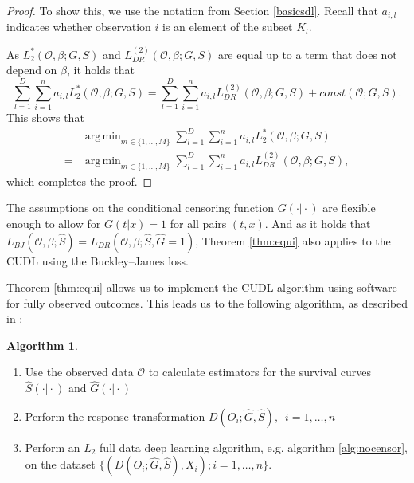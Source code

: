 \documentclass[12pt, a4paper]{scrartcl}
\theoremstyle{definition}
\newtheorem{Algorithm}{Algorithm}[section]
\theoremstyle{plain}
\numberwithin{equation}{section}
\numberwithin{figure}{section}
\numberwithin{table}{section}
\DeclareMathOperator*{\argmin}{arg\,min}
\begin{document}
\begin{proof}
		To show this, we use the notation from Section \ref{basicsdl}.
		Recall that $a_{i,l}$ indicates whether observation $i$ is an element of the subset $K_l$.
		
		As $L_2^*(\mathcal{O}, \beta; G,S)$ and $L_{DR}^{(2)}(\mathcal{O}, \beta; G,S)$ are equal up to a term that does not depend on $\beta$, it holds that
		\begin{equation*}
		\sum_{l=1}^{D} \sum_{i=1}^{n} a_{i,l} L_2^*(\mathcal{O}, \beta; G,S) = \sum_{l=1}^{D} \sum_{i=1}^{n} a_{i,l} L_{DR}^{(2)}(\mathcal{O}, \beta; G,S) + const(\mathcal{O}; G,S).
		\end{equation*}
		This shows that
		\begin{equation*}
		\begin{split}
		 &\argmin_{m \in \{1,\dots, M\}}\sum_{l=1}^{D} \sum_{i=1}^{n} a_{i,l} L_2^*(\mathcal{O}, \beta; G,S)\\
		  = &\argmin_{m \in \{1,\dots, M\}}\sum_{l=1}^{D} \sum_{i=1}^{n} a_{i,l} L_{DR}^{(2)}(\mathcal{O}, \beta; G,S),
		 \end{split}
		\end{equation*}
		which completes the proof.
	\end{proof}

	The assumptions on the conditional censoring function $G(\cdot\vert\cdot)$ are flexible enough to allow for $G(t\vert x)=1$ for all pairs $(t,x)$.
	And as it holds that $L_{BJ}(\mathcal{O}, \beta; \hat{S})=L_{DR}(\mathcal{O}, \beta; \hat{S}, \hat{G} = 1)$, Theorem \ref{thm:equi} also applies to the CUDL using the Buckley--James loss.
	
	Theorem \ref{thm:equi} allows us to implement the CUDL algorithm using software for fully observed outcomes.
	This leads us to the following algorithm, as described in \citet*{basearticle}:
	\begin{Algorithm}\label{alg:censor}~
		\begin{enumerate}
			\item Use the observed data $\mathcal{O}$ to calculate estimators for the survival curves $\hat{S}(\cdot\vert\cdot)$ and $\hat{G}(\cdot\vert\cdot)$
			\item Perform the response transformation $D(O_i; \hat{G},\hat{S}),$~$ i = 1,\dots,n$
			\item Perform an $L_2$ full data deep learning algorithm, e.g. algorithm \ref{alg:nocensor}, on the dataset $\{(D(O_i; \hat{G},\hat{S}), X_i); i = 1,\dots,n\}$.
		\end{enumerate}
	\end{Algorithm}
\end{document}
